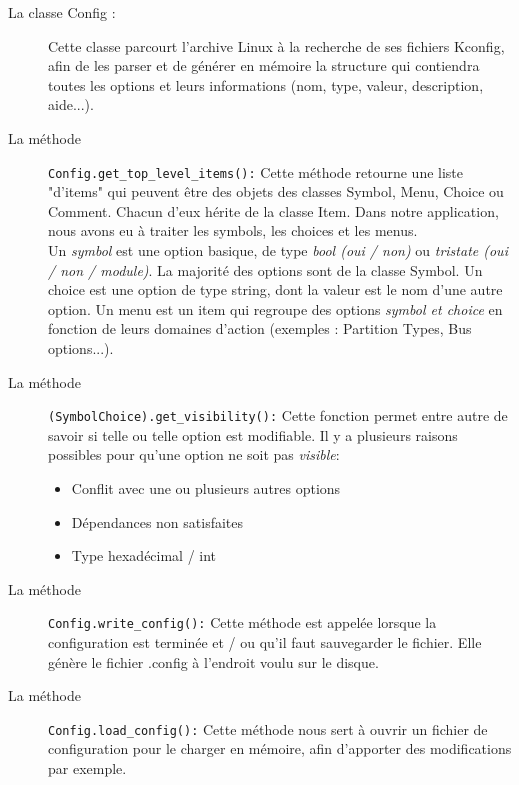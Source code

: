 \documentclass[16pts]{report}
\begin{document}
    \begin{description}
        \item[La classe Config :] Cette classe parcourt l'archive Linux à la
            recherche de ses fichiers Kconfig, afin de les parser et de générer
            en mémoire la structure qui contiendra toutes les options et leurs
            informations (nom, type, valeur, description, aide...). \\

        \item[La méthode ] \verb|Config.get_top_level_items():| Cette méthode
            retourne une liste "d'items" qui peuvent être des objets des
            classes Symbol, Menu, Choice ou Comment. Chacun d'eux hérite de la
            classe Item.  Dans notre application, nous avons eu à traiter les
            symbols, les choices et les menus.\\

            Un \textit{symbol} est une option basique, de type \textit{bool
            (oui / non)} ou \textit{tristate (oui / non / module)}. La majorité
            des options sont de la classe Symbol.  Un choice est une option de
            type string, dont la valeur est le nom d'une autre option.  Un menu
            est un item qui regroupe des options \textit{symbol et choice} en
            fonction de leurs domaines d'action (exemples : Partition Types,
            Bus options...).
        \item[La méthode ] \verb|(Symbol|\verb|Choice).get_visibility():| Cette
            fonction permet entre autre de savoir si telle ou telle option est
            modifiable. Il y a plusieurs raisons possibles pour qu'une option
            ne soit pas \textit{visible}:
            \begin{itemize}
                \item Conflit avec une ou plusieurs autres options
                \item Dépendances non satisfaites
                \item Type hexadécimal / int \newline
            \end{itemize}
        \item[La méthode ] \verb|Config.write_config():| Cette méthode est
            appelée lorsque la configuration est terminée et / ou qu'il faut
            sauvegarder le fichier. Elle génère le fichier .config à l'endroit
            voulu sur le disque.
        \item[La méthode ] \verb|Config.load_config():| Cette méthode nous sert
            à ouvrir un fichier de configuration pour le charger en mémoire,
            afin d'apporter des modifications par exemple.
    \end{description}
\end{document}
